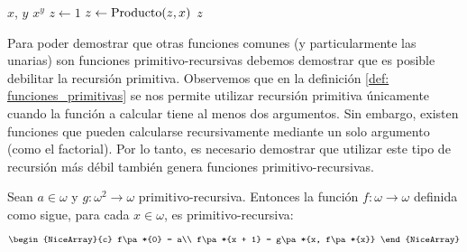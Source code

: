 \begin{algorithm}[h!]
	\caption{Exponenciación}

	\begin{algorithmic}
		\Require $x$, $y$
		\Ensure $x^{y}$
		\State $z\gets 1$
		\State $z\gets\text{Producto}\pa*{z, x}$
		\EndFor
		\State \Return $z$
	\end{algorithmic}
\end{algorithm}

Para poder demostrar que otras funciones comunes (y particularmente las unarias) son funciones primitivo-recursivas debemos demostrar que es posible debilitar la recursión primitiva. Observemos que en la definición \ref{def: funciones_primitivas} se nos permite utilizar recursión primitiva únicamente cuando la función a calcular tiene al menos dos argumentos. Sin embargo, existen funciones que pueden calcularse recursivamente mediante un solo argumento (como el factorial). Por lo tanto, es necesario demostrar que utilizar este tipo de recursión más débil también genera funciones primitivo-recursivas.

\begin{theorem}
	Sean $a\in\omega$ y $g:\omega^{2}\to\omega$ primitivo-recursiva. Entonces la función $f:\omega\to\omega$ definida como sigue, para cada $x\in\omega$, es primitivo-recursiva:
	\[
		\begin{NiceArray}{c}
			f\pa*{0} = a\\
			f\pa*{x + 1} = g\pa*{x, f\pa*{x}}
		\end{NiceArray}
	\]
\end{theorem}

